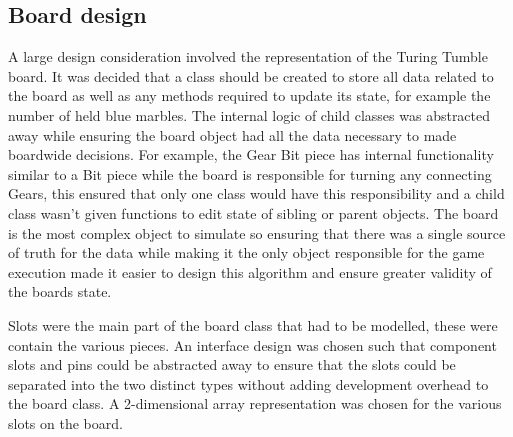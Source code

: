 \documentclass{l4proj}
\begin{document}
\subsection{Board design}
A large design consideration involved the representation of the Turing Tumble board. It was decided that a class should be created to store all data related to the board as well as any methods required to update its state, for example the number of held blue marbles. The internal logic of child classes was abstracted away while ensuring the board object had all the data necessary to made boardwide decisions. For example, the Gear Bit piece has internal functionality similar to a Bit piece while the board is responsible for turning any connecting Gears, this ensured that only one class would have this responsibility and a child class wasn't given functions to edit state of sibling or parent objects. The board is the most complex object to simulate so ensuring that there was a single source of truth for the data while making it the only object responsible for the game execution made it easier to design this algorithm and ensure greater validity of the boards state. 

Slots were the main part of the board class that had to be modelled, these were contain the various pieces. An interface design was chosen such that component slots and pins could be abstracted away to ensure that the slots could be separated into the two distinct types without adding development overhead to the board class. A 2-dimensional array representation was chosen for the various slots on the board. 



\end{document}
